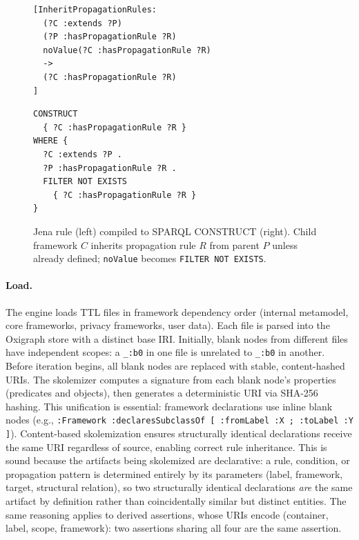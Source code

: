\documentclass[runningheads,oneside]{llncs}
\begin{document}
\begin{figure}[ht]
\centering
\begin{minipage}[t]{0.40\textwidth}
\vspace{0pt}
\begin{lstlisting}[basicstyle=\ttfamily\tiny, frame=none]
[InheritPropagationRules:
  (?C :extends ?P)
  (?P :hasPropagationRule ?R)
  noValue(?C :hasPropagationRule ?R)
  ->
  (?C :hasPropagationRule ?R)
]
\end{lstlisting}
\end{minipage}%
\hspace{0.3em}\textcolor{gray!50}{\vrule}\hspace{0.3em}%
\begin{minipage}[t]{0.40\textwidth}
\vspace{0pt}
\begin{lstlisting}[basicstyle=\ttfamily\tiny, frame=none, language=SPARQL]
CONSTRUCT
  { ?C :hasPropagationRule ?R }
WHERE {
  ?C :extends ?P .
  ?P :hasPropagationRule ?R .
  FILTER NOT EXISTS
    { ?C :hasPropagationRule ?R }
}
\end{lstlisting}
\end{minipage}
\caption{Jena rule (left) compiled to SPARQL CONSTRUCT (right). Child framework $C$ inherits propagation rule $R$ from parent $P$ unless already defined; \texttt{noValue} becomes \texttt{FILTER NOT EXISTS}.}
\label{fig:jena-compile}
\end{figure}

\paragraph{Load.}
The engine loads TTL files in framework dependency order (internal metamodel, core frameworks, privacy frameworks, user data). Each file is parsed into the Oxigraph store with a distinct base IRI. Initially, blank nodes from different files have independent scopes: a {\footnotesize\texttt{\_:b0}} in one file is unrelated to {\footnotesize\texttt{\_:b0}} in another. Before iteration begins, all blank nodes are replaced with stable, content-hashed URIs. The skolemizer computes a signature from each blank node's properties (predicates and objects), then generates a deterministic URI via SHA-256 hashing. This unification is essential: framework declarations use inline blank nodes (e.g., {\footnotesize\texttt{:Framework :declaresSubclassOf [ :fromLabel :X ; :toLabel :Y ]}}). Content-based skolemization ensures structurally identical declarations receive the same URI regardless of source, enabling correct rule inheritance. This is sound because the artifacts being skolemized are declarative: a rule, condition, or propagation pattern is determined entirely by its parameters (label, framework, target, structural relation), so two structurally identical declarations \emph{are} the same artifact by definition rather than coincidentally similar but distinct entities. The same reasoning applies to derived assertions, whose URIs encode (container, label, scope, framework): two assertions sharing all four are the same assertion.
\end{document}
